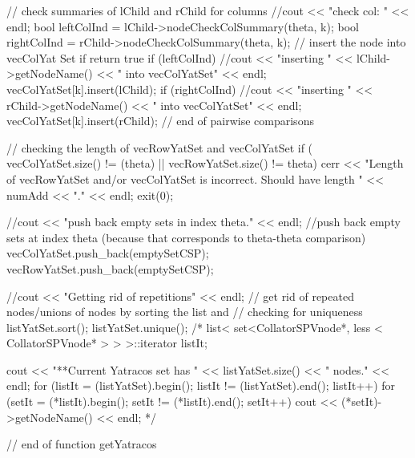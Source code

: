 \begin{DoxyCode}
{{    // check summaries of lChild and rChild for columns
    //cout << "check col: " << endl;
    bool leftColInd = lChild->nodeCheckColSummary(theta, k);
    bool rightColInd = rChild->nodeCheckColSummary(theta, k);
      // insert the node into vecColYat Set if return true
        if (leftColInd) { 
      //cout << "inserting " << lChild->getNodeName() << " into vecColYatSet"
       << endl; 
      vecColYatSet[k].insert(lChild);
    }
    if (rightColInd) { 
      //cout << "inserting " << rChild->getNodeName() << " into vecColYatSet"
       << endl; 
      vecColYatSet[k].insert(rChild);
    }    
  } // end of pairwise comparisons

   // checking the length of vecRowYatSet and vecColYatSet
   if ( vecColYatSet.size() != (theta) || vecRowYatSet.size() != theta) {
     cerr << "Length of vecRowYatSet and/or vecColYatSet is incorrect. Should
       have length " << numAdd << "." << endl;
    exit(0); 
   }

  //cout << "push back empty sets in index theta." << endl;
  //push back empty sets at index theta (because that corresponds to
       theta-theta comparison)
  vecColYatSet.push_back(emptySetCSP); 
  vecRowYatSet.push_back(emptySetCSP);

  //cout << "Getting rid of repetitions" << endl;
   // get rid of repeated nodes/unions of nodes by sorting the list and 
   // checking for uniqueness
  listYatSet.sort();
  listYatSet.unique();
  /*
  list< set<CollatorSPVnode*, less < CollatorSPVnode* > > >::iterator listIt;  
         
  cout << "**Current Yatracos set has " << listYatSet.size() << " nodes." <<
       endl;
  for (listIt = (listYatSet).begin(); listIt != (listYatSet).end(); listIt++) {
    for (setIt = (*listIt).begin(); setIt != (*listIt).end(); setIt++) {
      cout << (*setIt)->getNodeName() << endl;
    }
  }*/
} // end of function getYatracos
\end{DoxyCode}
